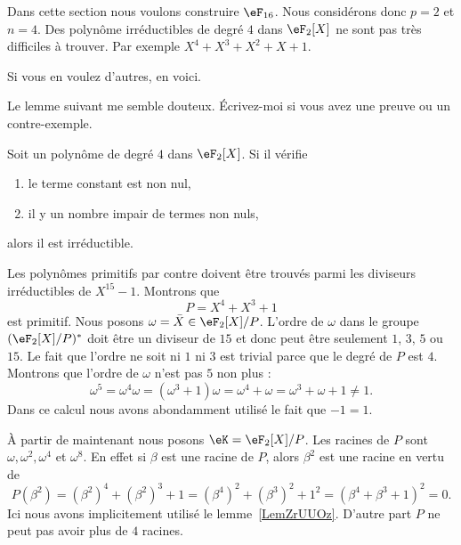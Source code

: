 Dans cette section nous voulons construire \( \eF_{16}\). Nous considérons donc \( p=2\) et \( n=4\). Des polynôme irréductibles de degré \( 4\) dans \( \eF_2[X]\) ne sont pas très difficiles à trouver. Par exemple \( X^4+X^3+X^2+X+1\).

Si vous en voulez d'autres, en voici.

\begin{probleme}
	Le lemme suivant me semble douteux. Écrivez-moi si vous avez une preuve ou un contre-exemple.
\end{probleme}

\begin{lemma}        \label{LEMooTBROooANstIL}
	Soit un polynôme de degré \( 4\) dans \( \eF_2[X]\). Si il vérifie
	\begin{enumerate}
		\item
		      le terme constant est non nul,
		\item
		      il y un nombre impair de termes non nuls,
	\end{enumerate}
	alors il est irréductible.
\end{lemma}

Les polynômes primitifs par contre doivent être trouvés parmi les diviseurs irréductibles de \( X^{15}-1\). Montrons que
\begin{equation}
	P=X^4+X^3+1
\end{equation}
est primitif. Nous posons \( \omega=\bar X\in \eF_2[X]/P\). L'ordre de \( \omega\) dans le groupe \( (\eF_2[X]/P)^* \) doit être un diviseur de \( 15\) et donc peut être seulement \( 1\), \( 3\), \( 5\) ou \( 15\). Le fait que l'ordre ne soit ni \( 1\) ni \( 3\) est trivial parce que le degré de \( P\) est \( 4\). Montrons que l'ordre de \( \omega\) n'est pas \( 5\) non plus :
\begin{equation}
	\omega^5=\omega^4\omega=(\omega^3+1)\omega=\omega^4+\omega=\omega^3+\omega+1\neq 1.
\end{equation}
Dans ce calcul nous avons abondamment utilisé le fait que \( -1=1\).

À partir de maintenant nous posons \( \eK=\eF_2[X]/P\). Les racines de \( P\) sont \( \omega,\omega^2,\omega^4\) et \( \omega^8\). En effet si \( \beta\) est une racine de \( P\), alors \( \beta^2\) est une racine en vertu de
\begin{equation}
	P(\beta^2)=(\beta^2)^4+(\beta^2)^3+1=(\beta^4)^2+(\beta^3)^2+1^2=(\beta^4+\beta^3+1)^2=0.
\end{equation}
Ici nous avons implicitement utilisé le lemme~\ref{LemZrUUOz}. D'autre part \( P\) ne peut pas avoir plus de \( 4\) racines.

